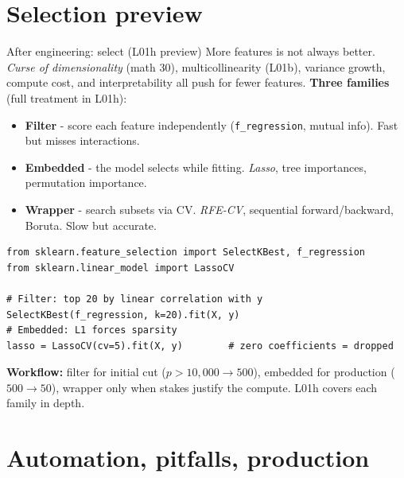 \documentclass[aspectratio=169]{beamer}
\begin{document}
\section{Selection preview}

\begin{frame}[fragile]{After engineering: select (L01h preview)}
  More features is not always better. \emph{Curse of dimensionality} (math 30), multicollinearity (L01b), variance growth, compute cost, and interpretability all push for fewer features.
  \vfill
  \textbf{Three families} (full treatment in L01h):
  \begin{itemize}\footnotesize
    \item \textbf{Filter} - score each feature independently (\texttt{f\_regression}, mutual info). Fast but misses interactions.
    \item \textbf{Embedded} - the model selects while fitting. \emph{Lasso}, tree importances, permutation importance.
    \item \textbf{Wrapper} - search subsets via CV. \emph{RFE-CV}, sequential forward/backward, Boruta. Slow but accurate.
  \end{itemize}
  \vfill
{\lstset{basicstyle=\ttfamily\scriptsize}
\begin{lstlisting}
from sklearn.feature_selection import SelectKBest, f_regression
from sklearn.linear_model import LassoCV

# Filter: top 20 by linear correlation with y
SelectKBest(f_regression, k=20).fit(X, y)
# Embedded: L1 forces sparsity
lasso = LassoCV(cv=5).fit(X, y)        # zero coefficients = dropped
\end{lstlisting}}
  \vfill
  \footnotesize \textbf{Workflow:} filter for initial cut ($p > 10{,}000 \to 500$), embedded for production ($500 \to 50$), wrapper only when stakes justify the compute. L01h covers each family in depth.
\end{frame}

\section{Automation, pitfalls, production}
\end{document}
